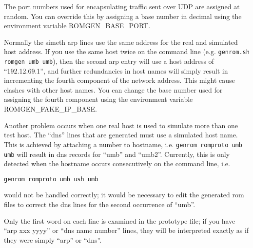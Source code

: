 The port numbers used for encapsulating traffic sent over UDP are
assigned at random.  You can override this by assigning a base number
in decimal using the environment variable ROMGEN\_BASE\_PORT.

Normally the simeth arp lines use the same address for the real and
simulated host address.  If you use the same host twice on the command
line (e.g. {\tt genrom.sh romgen umb umb}), then the second arp entry will
use a host address of ``192.12.69.1'', and further redundancies in host
names will simply result in incrementing the fourth component of the
network address.  This might cause clashes with other host names.
You can change the base number used for assigning the fourth component
using the environment variable ROMGEN\_FAKE\_IP\_BASE.

Another problem occurs when one real host is used to simulate more
than one test host.  The ``dns'' lines that are generated must use a
simulated host name.  This is achieved by attaching a number to
hostname, i.e. {\tt genrom romproto umb umb} will result in dns records
for ``umb'' and ``umb2''.  Currently, this is only detected when the
hostname occurs consecutively on the command line, i.e. 

{\tt genrom romproto umb ush umb}

would not be handled correctly; it would be
necessary to edit the generated rom files to correct the dns lines
for the second occurrence of ``umb''.

Only the first word on each line is examined in the prototype file;
if you have ``arp xxx yyyy'' or ``dns name number'' lines, they will
be interpreted exactly as if they were simply ``arp'' or ``dns''.
